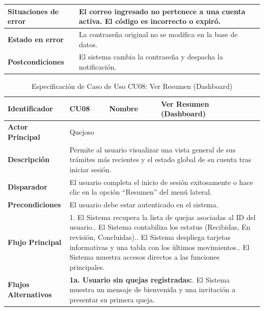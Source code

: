\begin{longtable}{|p{3.5cm}|p{2cm}|p{2.5cm}|p{7cm}|}
\textbf{Situaciones de error} & \multicolumn{3}{p{11.5cm}|}{El correo ingresado no pertenece a una cuenta activa. El código es incorrecto o expiró.} \\ \hline
\textbf{Estado en error} & \multicolumn{3}{p{11.5cm}|}{La contraseña original no se modifica en la base de datos.} \\ \hline
\textbf{Postcondiciones} & \multicolumn{3}{p{11.5cm}|}{El sistema cambia la contraseña y despacha la notificación.} \\ \hline
\end{longtable}
\endgroup

\vspace{0.8cm}

\begingroup
\setlength{\parskip}{0pt}
\begin{longtable}{|p{3.5cm}|p{2cm}|p{2.5cm}|p{7cm}|}
\caption{Especificación de Caso de Uso CU08: Ver Resumen (Dashboard)}
\label{tab:cu08_ver_resumen} \\
\hline
\textbf{Identificador} & CU08 & \textbf{Nombre} & Ver Resumen (Dashboard) \\ \hline
\textbf{Actor Principal} & \multicolumn{3}{p{11.5cm}|}{Quejoso} \\ \hline
\textbf{Descripción} & \multicolumn{3}{p{11.5cm}|}{Permite al usuario visualizar una vista general de sus trámites más recientes y el estado global de su cuenta tras iniciar sesión.} \\ \hline
\textbf{Disparador} & \multicolumn{3}{p{11.5cm}|}{El usuario completa el inicio de sesión exitosamente o hace clic en la opción ``Resumen'' del menú lateral.} \\ \hline
\textbf{Precondiciones} & \multicolumn{3}{p{11.5cm}|}{El usuario debe estar autenticado en el sistema.} \\ \hline
\textbf{Flujo Principal} & \multicolumn{3}{p{11.5cm}|}{1. El Sistema recupera la lista de quejas asociadas al ID del usuario.\newline 2. El Sistema contabiliza los estatus (Recibidas, En revisión, Concluidas).\newline 3. El Sistema despliega tarjetas informativas y una tabla con los últimos movimientos.\newline 4. El Sistema muestra accesos directos a las funciones principales.} \\ \hline
\textbf{Flujos Alternativos} & \multicolumn{3}{p{11.5cm}|}{\textbf{1a. Usuario sin quejas registradas:}\newline 1. El Sistema muestra un mensaje de bienvenida y una invitación a presentar su primera queja.} \\ \hline

\end{longtable}
